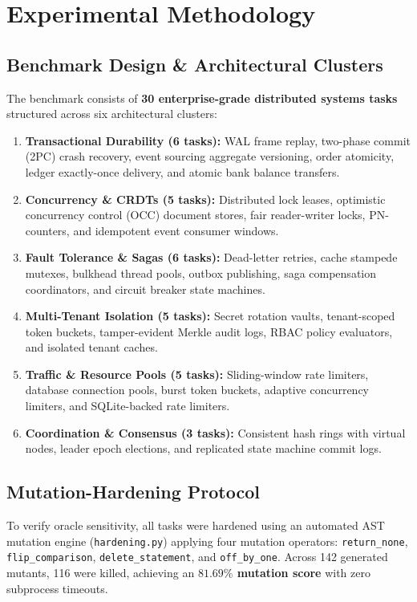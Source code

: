 \documentclass[10pt,twocolumn,letterpaper]{article}
\begin{document}
\section{Experimental Methodology}

\subsection{Benchmark Design \& Architectural Clusters}
The benchmark consists of \textbf{30 enterprise-grade distributed systems tasks} structured across six architectural clusters:
\begin{enumerate}
    \item \textbf{Transactional Durability (6 tasks):} WAL frame replay, two-phase commit (2PC) crash recovery, event sourcing aggregate versioning, order atomicity, ledger exactly-once delivery, and atomic bank balance transfers.
    \item \textbf{Concurrency \& CRDTs (5 tasks):} Distributed lock leases, optimistic concurrency control (OCC) document stores, fair reader-writer locks, PN-counters, and idempotent event consumer windows.
    \item \textbf{Fault Tolerance \& Sagas (6 tasks):} Dead-letter retries, cache stampede mutexes, bulkhead thread pools, outbox publishing, saga compensation coordinators, and circuit breaker state machines.
    \item \textbf{Multi-Tenant Isolation (5 tasks):} Secret rotation vaults, tenant-scoped token buckets, tamper-evident Merkle audit logs, RBAC policy evaluators, and isolated tenant caches.
    \item \textbf{Traffic \& Resource Pools (5 tasks):} Sliding-window rate limiters, database connection pools, burst token buckets, adaptive concurrency limiters, and SQLite-backed rate limiters.
    \item \textbf{Coordination \& Consensus (3 tasks):} Consistent hash rings with virtual nodes, leader epoch elections, and replicated state machine commit logs.
\end{enumerate}

\subsection{Mutation-Hardening Protocol}
To verify oracle sensitivity, all tasks were hardened using an automated AST mutation engine (\texttt{hardening.py}) applying four mutation operators: \texttt{return\_none}, \texttt{flip\_comparison}, \texttt{delete\_statement}, and \texttt{off\_by\_one}. Across 142 generated mutants, 116 were killed, achieving an \textbf{$81.69\%$ mutation score} with zero subprocess timeouts.
\end{document}
